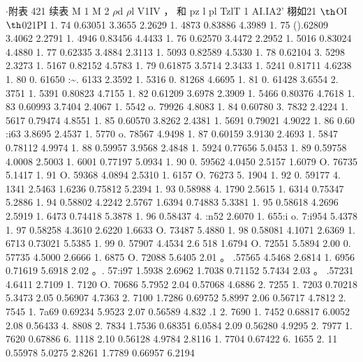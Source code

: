 $\cdot $附表 421 续表 M 1 M 2 $\rho$d $\rho$l V1IV ， 和 pz l pl TzlT 1 AI.IA2' 栩如21 ${\rm þ}$OI ${\rm þ}$021PI 1. 74 0.63051 3.3655 2.2629 1. 4873 0.83886 4.3989 1. 75 ().62809 3.4062 2.2791 1. 4946 0.83456 4.4433 1. 76 0.62570 3.4472 2.2952 1. 5016 0.83024 4.4880 1. 77 0.62335 3.4884 2.3113 1. 5093 0.82589 4.5330 1. 78 0.62104 3. 5298 2.3273 1. 5167 0.82152 4.5783 1. 79 0.61875 3.5714 2.3433 1. 5241 0.81711 4.6238 1. 80 0. 61650 :\textasciitilde{}. 6133 2.3592 1. 5316 0. 81268 4.6695 1. 81 0. 61428 3.6554 2. 3751 1. 5391 0.80823 4.7155 1. 82 0.61209 3.6978 2.3909 1. 5466 0.80376 4.7618 1. 83 0.60993 3.7404 2.4067 1. 5542 o. 79926 4.8083 1. 84 0.60780 3. 7832 2.4224 1. 5617 0.79474 4.8551 1. 85 0.60570 3.8262 2.4381 1. 5691 0.79021 4.9022 1. 86 0.60 :i63 3.8695 2.4537 1. 5770 o. 78567 4.9498 1. 87 0.60159 3.9130 2.4693 1. 5847 0.78112 4.9974 1. 88 0.59957 3.9568 2.4848 1. 5924 0.77656 5.0453 1. 89 0.59758 4.0008 2.5003 1. 6001 0.77197 5.0934 1. 90 0. 59562 4.0450 2.5157 1.6079 O. 76735 5.1417 1. 91 O. 59368 4.0894 2.5310 1. 6157 O. 76273 5. 1904 1. 92 0. 59177 4. 1341 2.5463 1.6236 0.75812 5.2394 1. 93 0.58988 4. 1790 2.5615 1. 6314 0.75347 5.2886 1. 94 0.58802 4.2242 2.5767 1.6394 0.74883 5.3381 1. 95 0.58618 4.2696 2.5919 1. 6473 0.74418 5.3878 1. 96 0.58437 4. :n52 2.6070 1. 655:i o. 7:i954 5.4378 1. 97 0.58258 4.3610 2.6220 1.6633 O. 73487 5.4880 1. 98 0.58081 4.1071 2.6369 1. 6713 0.73021 5.5385 1. 99 0. 57907 4.4534 2.6 518 1.6794 O. 72551 5.5894 2.00 0. 57735 4.5000 2.6666 1. 6875 O. 72088 5.6405 2.01 。 .57565 4.5468 2.6814 1. 6956 0.71619 5.6918 2.02 。. 57:i97 1.5938 2.6962 1.7038 0.71152 5.7434 2.03 。 .57231 4.6411 2.7109 1. 7120 O. 70686 5.7952 2.04 0.57068 4.6886 2. 7255 1. 7203 0.70218 5.3473 2.05 0.56907 4.7363 2. 7100 1.7286 0.69752 5.8997 2.06 0.56717 4.7812 2. 7545 1. 7a69 0.69234 5.9523 2.07 0.56589 4.832 .1 2. 7690 1. 7452 0.68817 6.0052 2.08 0.56433 4. 8808 2. 7834 1.7536 0.68351 6.0584 2.09 0.56280 4.9295 2. 7977 1. 7620 0.67886 6. 1118 2.10 0.56128 4.9784 2.8116 1. 7704 0.67422 6. 1655 2. 11 0.55978 5.0275 2.8261 1.7789 0.66957 6.2194


